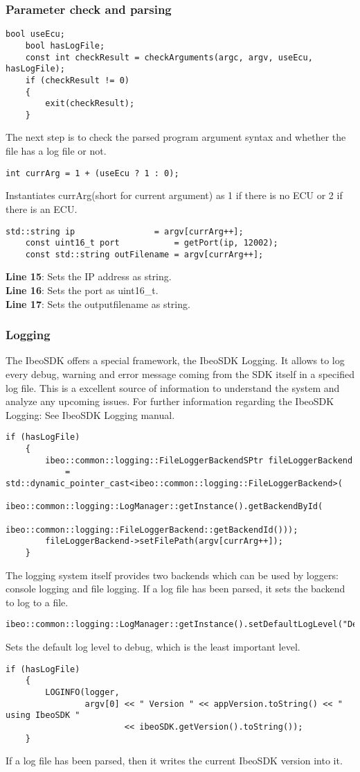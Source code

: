 \subsubsection{Parameter check and parsing}
\begin{lstlisting}[firstnumber=last]
	bool useEcu;
	bool hasLogFile;
	const int checkResult = checkArguments(argc, argv, useEcu, hasLogFile);
	if (checkResult != 0)
	{
		exit(checkResult);
	}
\end{lstlisting}
The next step is to check the parsed program argument syntax and whether the file has a log file or not.
\begin{lstlisting}[firstnumber=last]
	int currArg = 1 + (useEcu ? 1 : 0);
\end{lstlisting}
Instantiates currArg(short for current argument) as 1 if there is no ECU or 2 if there is an ECU.
\begin{lstlisting}[firstnumber=last]
	std::string ip                = argv[currArg++];
	const uint16_t port           = getPort(ip, 12002);
	const std::string outFilename = argv[currArg++];
\end{lstlisting}
\textbf{Line 15}: Sets the IP address as string. \\
\textbf{Line 16}: Sets the port as uint16\_t.\\
\textbf{Line 17}: Sets the outputfilename as string.
\subsubsection{Logging}
The IbeoSDK offers a special framework, the IbeoSDK Logging. It allows to log every debug, warning and error message coming from the SDK itself in a specified log file. This is a excellent source of information to understand the system and analyze any upcoming issues. For further information regarding the IbeoSDK Logging: See IbeoSDK Logging manual. \\
\begin{lstlisting}[firstnumber=last]
	if (hasLogFile)
	{
		ibeo::common::logging::FileLoggerBackendSPtr fileLoggerBackend
			= std::dynamic_pointer_cast<ibeo::common::logging::FileLoggerBackend>(
				ibeo::common::logging::LogManager::getInstance().getBackendById(
					ibeo::common::logging::FileLoggerBackend::getBackendId()));
		fileLoggerBackend->setFilePath(argv[currArg++]);
	}
\end{lstlisting}
The logging system itself provides two backends which can be used by loggers: console logging and file logging. If a log file has been parsed, it sets the backend to log to a file.
\begin{lstlisting}[firstnumber=last]
	ibeo::common::logging::LogManager::getInstance().setDefaultLogLevel("Debug");
\end{lstlisting}
Sets the default log level to debug, which is the least important level.
\begin{lstlisting}[firstnumber=last]
	if (hasLogFile)
	{
		LOGINFO(logger,
				argv[0] << " Version " << appVersion.toString() << "  using IbeoSDK " 
						<< ibeoSDK.getVersion().toString());
	}
\end{lstlisting}
If a log file has been parsed, then it writes the current IbeoSDK version into it. 
\newpage
